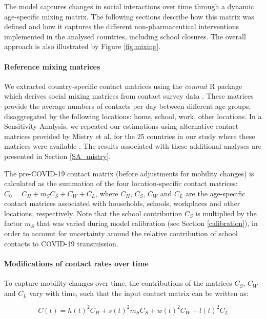 The model captures changes in social interactions over time through a dynamic age-specific mixing matrix. The following
sections describe how this matrix was defined and how it captures the different non-pharmaceutical interventions implemented
in the analysed countries, including school closures. The overall approach is also illustrated by Figure \ref{fig:mixing}.

\paragraph{Reference mixing matrices}
We extracted country-specific contact matrices using the \textit{conmat} R package which derives social mixing matrices from 
contact survey data \cite{conmat2024,mossong-2008}. These matrices provide the average numbers of contacts per day between different age groups, disaggregated by the following 
locations: home, school, work, other locations. In a Sensitivity Analysis, we repeated our estimations using alternative contact matrices provided by Mistry et al. 
for the 25 countries in our study where these matrices were available \cite{mistry2021}. The results associated with these 
additional analyses are presented in Section \ref{SA_mistry}.

The pre-COVID-19 contact matrix (before adjustments for mobility changes) is calculated as the summation of the four location-specific 
contact matrices: \(C_{0} = C_{H} + m_S C_{S} + C_{W} + C_{L}\), where \(C_{H}\), \(C_{S}\), \(C_{W}\) and \(C_{L}\) are the age-specific
contact matrices associated with households, schools, workplaces and other locations, respectively. Note that the school contribution $C_{S}$ is 
multiplied by the factor $m_S$ that was varied during model calibration (see Section \ref{calibration}), in order to account for uncertainty around 
the relative contribution of school contacts to COVID-19 transmission.

\paragraph{Modifications of contact rates over time}
\label{time_var_mixing}
To capture mobility changes over time, the contributions of the matrices \(C_{S}\), \(C_{W}\) and \(C_{L}\) vary with time, such that the input contact matrix can be written as:

\begin{equation}
\label{eq_mixing}
  C(t)= h(t)^{2}C_{H}+ s(t)^{2} m_S C_{S}+ w(t)^{2}C_{W}+l(t)^{2}C_{L}
\end{equation}

